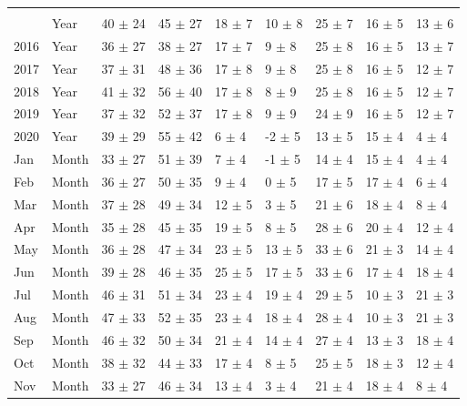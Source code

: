 \begin{longtable}[t]{lllllllll}
\endfoot
\bottomrule
\multicolumn{9}{l}{\rule{0pt}{1em}\textit{(continued on next page)}}\\
\endlastfoot
2015 & Year & 40 $\pm$ 24 & 45 $\pm$ 27 & 18 $\pm$ 7 & 10 $\pm$ 8 & 25 $\pm$ 7 & 16 $\pm$ 5 & 13 $\pm$ 6\\
2016 & Year & 36 $\pm$ 27 & 38 $\pm$ 27 & 17 $\pm$ 7 & 9 $\pm$ 8 & 25 $\pm$ 8 & 16 $\pm$ 5 & 13 $\pm$ 7\\
2017 & Year & 37 $\pm$ 31 & 48 $\pm$ 36 & 17 $\pm$ 8 & 9 $\pm$ 8 & 25 $\pm$ 8 & 16 $\pm$ 5 & 12 $\pm$ 7\\
2018 & Year & 41 $\pm$ 32 & 56 $\pm$ 40 & 17 $\pm$ 8 & 8 $\pm$ 9 & 25 $\pm$ 8 & 16 $\pm$ 5 & 12 $\pm$ 7\\
2019 & Year & 37 $\pm$ 32 & 52 $\pm$ 37 & 17 $\pm$ 8 & 9 $\pm$ 9 & 24 $\pm$ 9 & 16 $\pm$ 5 & 12 $\pm$ 7\\
2020 & Year & 39 $\pm$ 29 & 55 $\pm$ 42 & 6 $\pm$ 4 & -2 $\pm$ 5 & 13 $\pm$ 5 & 15 $\pm$ 4 & 4 $\pm$ 4\\
Jan & Month & 33 $\pm$ 27 & 51 $\pm$ 39 & 7 $\pm$ 4 & -1 $\pm$ 5 & 14 $\pm$ 4 & 15 $\pm$ 4 & 4 $\pm$ 4\\
Feb & Month & 36 $\pm$ 27 & 50 $\pm$ 35 & 9 $\pm$ 4 & 0 $\pm$ 5 & 17 $\pm$ 5 & 17 $\pm$ 4 & 6 $\pm$ 4\\
Mar & Month & 37 $\pm$ 28 & 49 $\pm$ 34 & 12 $\pm$ 5 & 3 $\pm$ 5 & 21 $\pm$ 6 & 18 $\pm$ 4 & 8 $\pm$ 4\\
Apr & Month & 35 $\pm$ 28 & 45 $\pm$ 35 & 19 $\pm$ 5 & 8 $\pm$ 5 & 28 $\pm$ 6 & 20 $\pm$ 4 & 12 $\pm$ 4\\
May & Month & 36 $\pm$ 28 & 47 $\pm$ 34 & 23 $\pm$ 5 & 13 $\pm$ 5 & 33 $\pm$ 6 & 21 $\pm$ 3 & 14 $\pm$ 4\\
Jun & Month & 39 $\pm$ 28 & 46 $\pm$ 35 & 25 $\pm$ 5 & 17 $\pm$ 5 & 33 $\pm$ 6 & 17 $\pm$ 4 & 18 $\pm$ 4\\
Jul & Month & 46 $\pm$ 31 & 51 $\pm$ 34 & 23 $\pm$ 4 & 19 $\pm$ 4 & 29 $\pm$ 5 & 10 $\pm$ 3 & 21 $\pm$ 3\\
Aug & Month & 47 $\pm$ 33 & 52 $\pm$ 35 & 23 $\pm$ 4 & 18 $\pm$ 4 & 28 $\pm$ 4 & 10 $\pm$ 3 & 21 $\pm$ 3\\
Sep & Month & 46 $\pm$ 32 & 50 $\pm$ 34 & 21 $\pm$ 4 & 14 $\pm$ 4 & 27 $\pm$ 4 & 13 $\pm$ 3 & 18 $\pm$ 4\\
Oct & Month & 38 $\pm$ 32 & 44 $\pm$ 33 & 17 $\pm$ 4 & 8 $\pm$ 5 & 25 $\pm$ 5 & 18 $\pm$ 3 & 12 $\pm$ 4\\
Nov & Month & 33 $\pm$ 27 & 46 $\pm$ 34 & 13 $\pm$ 4 & 3 $\pm$ 4 & 21 $\pm$ 4 & 18 $\pm$ 4 & 8 $\pm$ 4\\

\end{longtable}

